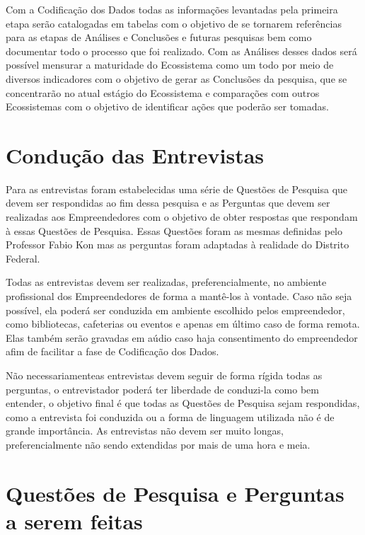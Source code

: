 Com a Codificação dos Dados todas as informações levantadas pela primeira etapa serão catalogadas em tabelas com o objetivo de se tornarem referências para as etapas de Análises e Conclusões e
futuras pesquisas bem como documentar todo o processo que foi realizado. Com as Análises desses dados será possível mensurar a maturidade do Ecossistema como um todo por meio de diversos indicadores
com o objetivo de gerar as Conclusões da pesquisa, que se concentrarão no atual estágio do Ecossistema e comparações com outros Ecossistemas com o objetivo de identificar ações que poderão ser tomadas.

\section{Condução das Entrevistas}
\label{section:conducao_das_entrevistas}

Para as entrevistas foram estabelecidas uma série de Questões de Pesquisa que devem ser respondidas ao fim dessa pesquisa e as Perguntas que devem ser realizadas aos Empreendedores com o objetivo de
obter respostas que respondam à essas Questões de Pesquisa. Essas Questões foram as mesmas definidas pelo Professor Fabio Kon mas as perguntas foram adaptadas à realidade do Distrito Federal.

Todas as entrevistas devem ser realizadas, preferencialmente, no ambiente profissional dos Empreendedores de forma a mantê-los à vontade. Caso não seja possível, ela poderá ser conduzida em ambiente
escolhido pelos empreendedor, como bibliotecas, cafeterias ou eventos e apenas em último caso de forma remota. Elas também serão gravadas em aúdio caso haja consentimento do empreendedor afim de
facilitar a fase de Codificação dos Dados.

Não necessariamenteas entrevistas devem seguir de forma rígida todas as perguntas, o entrevistador poderá ter liberdade de conduzi-la como bem entender, o objetivo final é que todas as Questões de Pesquisa
sejam respondidas, como a entrevista foi conduzida ou a forma de linguagem utilizada não é de grande importância. As entrevistas não devem ser muito longas, preferencialmente não sendo extendidas por mais
de uma hora e meia.

\section{Questões de Pesquisa e Perguntas a serem feitas}
\label{section:questoes_de_pesquisa_e_perguntas}

